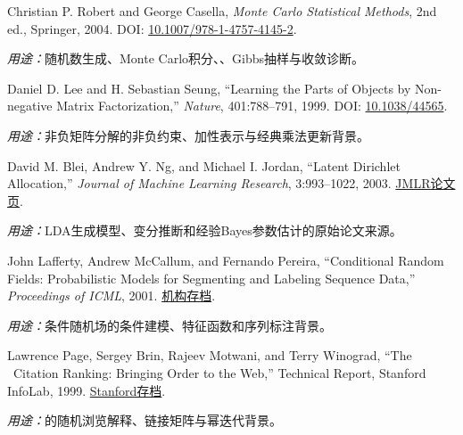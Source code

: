 \begin{enumerate}[leftmargin=2.4em,label={[\arabic{enumi}]}]
  \item Christian P. Robert and George Casella, \emph{Monte Carlo Statistical Methods}, 2nd ed., Springer, 2004. DOI: \href{https://doi.org/10.1007/978-1-4757-4145-2}{10.1007/978-1-4757-4145-2}.\par
  \emph{用途：}随机数生成、Monte Carlo积分、\MetropolisHastings{}、Gibbs抽样与收敛诊断。

  \item Daniel D. Lee and H. Sebastian Seung, ``Learning the Parts of Objects by Non-negative Matrix Factorization,'' \emph{Nature}, 401:788--791, 1999. DOI: \href{https://doi.org/10.1038/44565}{10.1038/44565}.\par
  \emph{用途：}非负矩阵分解的非负约束、加性表示与经典乘法更新背景。

  \item David M. Blei, Andrew Y. Ng, and Michael I. Jordan, ``Latent Dirichlet Allocation,'' \emph{Journal of Machine Learning Research}, 3:993--1022, 2003. \href{https://www.jmlr.org/papers/v3/blei03a.html}{JMLR论文页}.\par
  \emph{用途：}LDA生成模型、变分推断和经验Bayes参数估计的原始论文来源。

  \item John Lafferty, Andrew McCallum, and Fernando Pereira, ``Conditional Random Fields: Probabilistic Models for Segmenting and Labeling Sequence Data,'' \emph{Proceedings of ICML}, 2001. \href{https://repository.upenn.edu/bitstreams/4905e2c0-e9d5-4961-804b-973de8bdfc7c/download}{机构存档}.\par
  \emph{用途：}条件随机场的条件建模、特征函数和序列标注背景。

  \item Lawrence Page, Sergey Brin, Rajeev Motwani, and Terry Winograd, ``The \PageRank{}\ Citation Ranking: Bringing Order to the Web,'' Technical Report, Stanford InfoLab, 1999. \href{https://ilpubs.stanford.edu/422/}{Stanford存档}.\par
  \emph{用途：}\PageRank{}的随机浏览解释、链接矩阵与幂迭代背景。
\end{enumerate}
